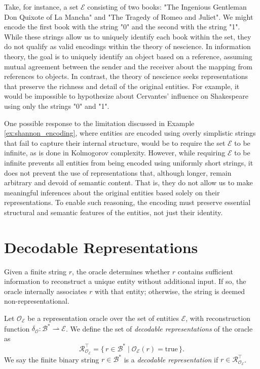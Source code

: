 \begin{example}
\label{ex:shannon_encoding}
Take, for instance, a set $\mathcal{E}$ consisting of two books: "The Ingenious Gentleman Don Quixote of La Mancha" and "The Tragedy of Romeo and Juliet". We might encode the first book with the string "0" and the second with the string "1". While these strings allow us to uniquely identify each book within the set, they do not qualify as valid encodings within the theory of nescience. In information theory, the goal is to uniquely identify an object based on a reference, assuming mutual agreement between the sender and the receiver about the mapping from references to objects. In contrast, the theory of nescience seeks representations that preserve the richness and detail of the original entities. For example, it would be impossible to hypothesize about Cervantes' influence on Shakespeare using only the strings "0" and "1".
\end{example}

One possible response to the limitation discussed in Example \ref{ex:shannon_encoding}, where entities are encoded using overly simplistic strings that fail to capture their internal structure, would be to require the set $\mathcal{E}$ to be infinite, as is done in Kolmogorov complexity. However, while requiring $\mathcal{E}$ to be infinite prevents all entities from being encoded using uniformly short strings, it does not prevent the use of representations that, although longer, remain arbitrary and devoid of semantic content. That is, they do not allow us to make meaningful inferences about the original entities based solely on their representations. To enable such reasoning, the encoding must preserve essential structural and semantic features of the entities, not just their identity.

%
%

\section{Decodable Representations}
\label{sec:decodable_representations}

Given a finite string $r$, the oracle determines whether $r$ contains sufficient information to reconstruct a unique entity without additional input. If so, the oracle internally associates $r$ with that entity; otherwise, the string is deemed non-representational.

\begin{definition}
Let \(\mathcal{O}_{\mathcal{E}}\) be a representation oracle over the set of entities \(\mathcal{E}\), with reconstruction function
\(\delta_{\mathcal O} : \mathcal{B}^\ast \rightharpoonup \mathcal{E}\).
We define the set of \emph{decodable representations} of the oracle as
\[
\mathcal{R}_{\mathcal{O}_{\mathcal{E}}}^{\top}
=
\{\, r \in \mathcal{B}^\ast \mid \mathcal{O}_{\mathcal{E}}(r)=\mathrm{true} \,\}.
\]
We say the finite binary string $r \in \mathcal{B}^\ast$ is a \emph{decodable representation} if $r \in \mathcal{R}_{\mathcal{O}_{\mathcal{E}}}^{\top}$.
\end{definition}

